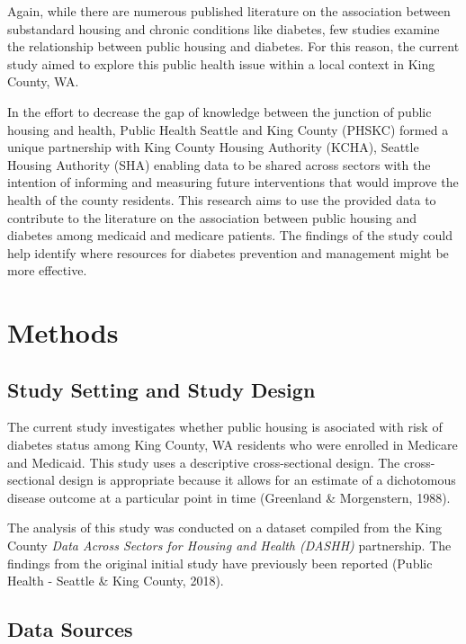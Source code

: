 \documentclass [11pt, proquest] {uwthesis}[2015/03/03]
\begin{document}
Again, while there are numerous published literature on the association
between substandard housing and chronic conditions like diabetes, few
studies examine the relationship between public housing and diabetes.
For this reason, the current study aimed to explore this public health
issue within a local context in King County, WA.

In the effort to decrease the gap of knowledge between the junction of
public housing and health, Public Health Seattle and King County (PHSKC)
formed a unique partnership with King County Housing Authority (KCHA),
Seattle Housing Authority (SHA) enabling data to be shared across
sectors with the intention of informing and measuring future
interventions that would improve the health of the county residents.
This research aims to use the provided data to contribute to the
literature on the association between public housing and diabetes among
medicaid and medicare patients. The findings of the study could help
identify where resources for diabetes prevention and management might be
more effective.

\chapter{Methods}\label{methods}

\section{Study Setting and Study
Design}\label{study-setting-and-study-design}

The current study investigates whether public housing is asociated with
risk of diabetes status among King County, WA residents who were
enrolled in Medicare and Medicaid. This study uses a descriptive
cross-sectional design. The cross-sectional design is appropriate
because it allows for an estimate of a dichotomous disease outcome at a
particular point in time (Greenland \& Morgenstern, 1988).

The analysis of this study was conducted on a dataset compiled from the
King County \emph{Data Across Sectors for Housing and Health (DASHH)}
partnership. The findings from the original initial study have
previously been reported (Public Health - Seattle \& King County, 2018).

\section{Data Sources}\label{data-sources}
\end{document}
